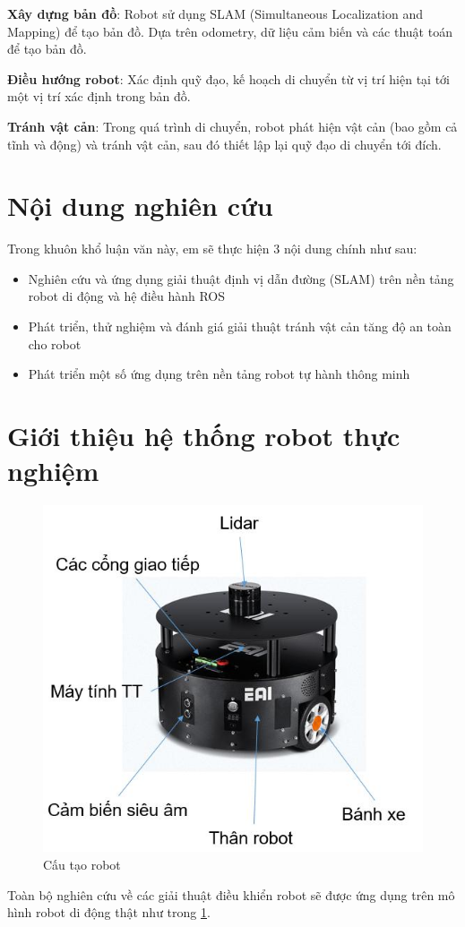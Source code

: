 \textbf{Xây dựng bản đồ}: Robot sử dụng SLAM (Simultaneous Localization and Mapping) để tạo bản đồ. Dựa trên odometry, dữ liệu cảm biến và các thuật toán để tạo bản đồ.

\textbf{Điều hướng robot}: Xác định quỹ đạo, kế hoạch di chuyển từ vị trí hiện tại tới một vị trí xác định trong bản đồ.

\textbf{Tránh vật cản}: Trong quá trình di chuyển, robot phát hiện vật cản (bao gồm cả tĩnh và động) và tránh vật cản, sau đó thiết lập lại quỹ đạo di chuyển tới đích.


\section{Nội dung nghiên cứu}

Trong khuôn khổ luận văn này, em sẽ thực hiện 3 nội dung chính như sau:
\begin{itemize}
	\item Nghiên cứu và ứng dụng giải thuật định vị dẫn đường (SLAM) trên nền tảng robot di động và hệ điều hành ROS
	\item Phát triển, thử nghiệm và đánh giá giải thuật tránh vật cản tăng độ an toàn cho robot
	\item Phát triển một số ứng dụng trên nền tảng robot tự hành thông minh
\end{itemize}

\section{Giới thiệu hệ thống robot thực nghiệm}
\begin{figure}[tph]
	\centering
	\includegraphics[width=0.7\linewidth]{chapter1/figs/eaiD1}
	\caption{Cấu tạo robot}
	\label{fig:eaid1}
\end{figure}
Toàn bộ nghiên cứu về các giải thuật điều khiển robot sẽ được ứng dụng trên mô hình robot di động thật như trong \figurename{\ref{fig:eaid1}}. 

